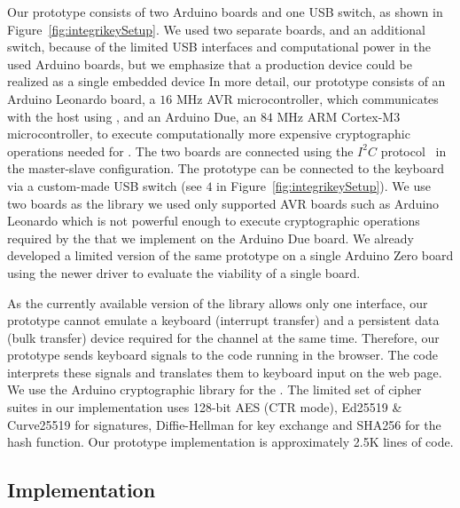 Our \device prototype consists of two Arduino boards and one USB switch, as shown in Figure~\ref{fig:integrikeySetup}. We used two separate boards, and an additional switch, because of the limited USB interfaces and computational power in the used Arduino boards, but we emphasize that a production device could be realized as a single embedded device
In more detail, our \device prototype consists of an Arduino Leonardo board, a $16$ MHz AVR microcontroller, which communicates with the host using \webusb, and an Arduino Due, an $84$ MHz ARM Cortex-M3 microcontroller, to execute computationally more expensive cryptographic operations needed for \tls. The two boards are connected using the $I^2C$ protocol~\cite{i2c} in the master-slave configuration. The prototype can be connected to the keyboard via a custom-made USB switch (see $4$ in Figure~\ref{fig:integrikeySetup}). We use two boards as the \webusb library we used only supported AVR boards such as Arduino Leonardo which is not powerful enough to execute cryptographic operations required by the \tls that we implement on the Arduino Due board. We already developed a limited version of the same prototype on a single Arduino Zero board using the newer driver to evaluate the viability of a single board.

As the currently available version of the \webusb library \cite{webusb} allows only one \usb interface, our prototype cannot emulate a keyboard (interrupt transfer) and a persistent data (bulk transfer) device required for the \tls channel at the same time. Therefore, our prototype sends keyboard signals to the \js code running in the browser. The \js code interprets these signals and translates them to keyboard input on the web page.
We use the Arduino cryptographic library for the \tls. The limited set of cipher suites in our \tls implementation uses 128-bit AES (CTR mode), Ed25519 \& Curve25519 for signatures, Diffie-Hellman for key exchange and SHA256 for the hash function. Our prototype implementation is approximately 2.5K lines of code. 


\subsection{\server Implementation} 

